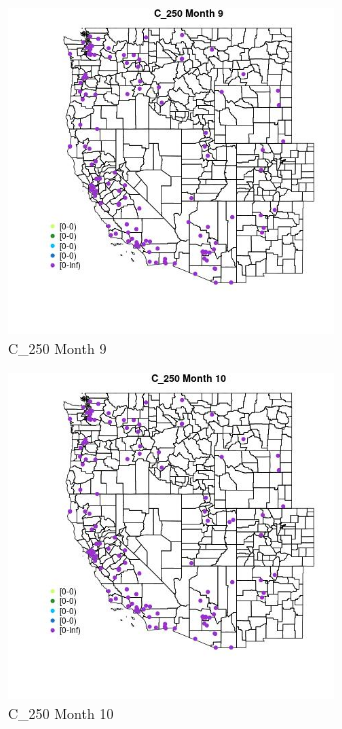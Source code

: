 \begin{figure} 
\centering  
\includegraphics[width=0.77\textwidth]{Code_Outputs/Report_ML_input_PM25_Step4_part_e_de_duplicated_aves_MapObsMo9C_250.jpg} 
\caption{\label{fig:Report_ML_input_PM25_Step4_part_e_de_duplicated_avesMapObsMo9C_250}C_250 Month 9} 
\end{figure} 
 

\clearpage 

\begin{figure} 
\centering  
\includegraphics[width=0.77\textwidth]{Code_Outputs/Report_ML_input_PM25_Step4_part_e_de_duplicated_aves_MapObsMo10C_250.jpg} 
\caption{\label{fig:Report_ML_input_PM25_Step4_part_e_de_duplicated_avesMapObsMo10C_250}C_250 Month 10} 
\end{figure} 
 

